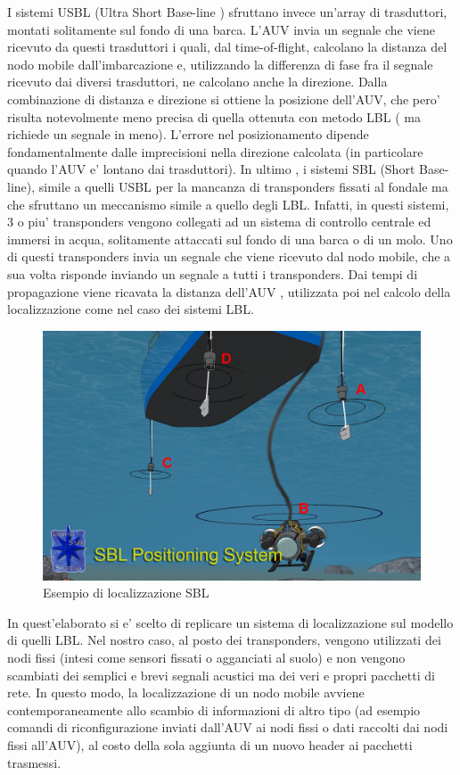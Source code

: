 I sistemi USBL (Ultra Short Base-line ) sfruttano invece un'array di trasduttori, montati solitamente sul fondo di una barca. L'AUV invia un segnale che viene ricevuto da questi trasduttori i quali, dal time-of-flight, calcolano la distanza del nodo mobile dall'imbarcazione e, utilizzando la differenza di fase fra il segnale ricevuto dai diversi trasduttori, ne calcolano anche la direzione. Dalla combinazione di distanza e direzione si ottiene la posizione dell'AUV, che pero' risulta notevolmente meno precisa di quella ottenuta con metodo LBL ( ma richiede un segnale in meno). L'errore nel posizionamento dipende fondamentalmente dalle imprecisioni nella direzione calcolata (in particolare quando l'AUV e' lontano dai trasduttori).\newline
In ultimo , i sistemi SBL (Short Base-line), simile a quelli USBL per la mancanza di transponders fissati al fondale ma che sfruttano un meccanismo simile a quello degli LBL. Infatti, in questi sistemi, 3 o piu' transponders vengono collegati ad un sistema di controllo centrale ed immersi in acqua, solitamente attaccati sul fondo di una barca o di un molo. Uno di questi transponders invia un segnale che viene ricevuto dal nodo mobile, che a sua volta risponde inviando un segnale a tutti i transponders. Dai tempi di propagazione viene ricavata la distanza dell'AUV , utilizzata poi nel calcolo della localizzazione come nel caso dei sistemi LBL.

\begin{figure}[H]
	\centering
	\includegraphics[scale=0.25]{SBL.jpg}
	\caption{ Esempio di localizzazione SBL}
	\label{fig:SBL}
\end{figure}


\par
In quest'elaborato si e' scelto di replicare un sistema di localizzazione sul modello di quelli LBL. Nel nostro caso, al posto dei transponders, vengono utilizzati dei nodi fissi (intesi come sensori fissati o agganciati al suolo) e non vengono scambiati dei semplici e brevi segnali acustici ma dei veri e propri pacchetti di rete. In questo modo, la localizzazione di un nodo mobile avviene contemporaneamente allo scambio di informazioni di altro tipo (ad esempio comandi di riconfigurazione inviati dall'AUV ai nodi fissi o dati raccolti dai nodi fissi all'AUV), al costo della sola aggiunta di un nuovo header ai pacchetti trasmessi.  

